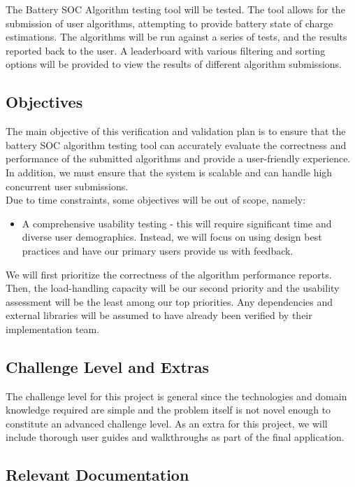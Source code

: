 \documentclass[12pt, titlepage]{article}
\begin{document}
The Battery SOC Algorithm testing tool will be tested. The tool allows for the submission of user algorithms, attempting to provide battery state of charge estimations. The algorithms will be run against a series of tests, and the results reported back to the user. A leaderboard with various filtering and sorting options will be provided to view the results of different algorithm submissions.

\subsection{Objectives}

The main objective of this verification and validation plan is to ensure that the battery SOC algorithm testing tool can accurately evaluate the correctness and performance of the submitted algorithms and provide a user-friendly experience. In addition, we must ensure that the system is scalable and can handle high concurrent user submissions. \\
\newline Due to time constraints, some objectives will be out of scope, namely:
\begin{itemize}
    \item A comprehensive usability testing - this will require significant time and diverse user demographics. Instead, we will focus on using design best practices and have our primary users provide us with feedback.
\end{itemize}
We will first prioritize the correctness of the algorithm performance reports. Then, the load-handling capacity will be our second priority and the usability assessment will be the least among our top priorities. Any dependencies and external libraries will be assumed to have already been verified by their implementation team.

\subsection{Challenge Level and Extras}

The challenge level for this project is general since the technologies and domain knowledge required are simple and the problem itself is not novel enough to constitute an advanced challenge level. As an extra for this project, we will include thorough user guides and walkthroughs as part of the final application.

\subsection{Relevant Documentation}
\end{document}
